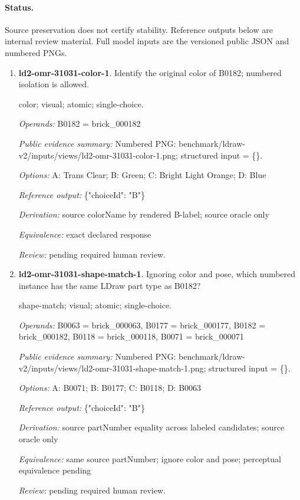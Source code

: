 \paragraph{Status.}Source preservation does not certify stability. Reference outputs below are internal review material. Full model inputs are the versioned public JSON and numbered PNGs.
\begin{enumerate}
\item \textbf{ld2-omr-31031-color-1}. Identify the original color of B0182; numbered isolation is allowed.
\par{\small color; visual; atomic; single-choice.\par\textit{Operands:} B0182 = brick\_000182\par\textit{Public evidence summary:} Numbered PNG: benchmark/ldraw-v2/inputs/views/ld2-omr-31031-color-1.png; structured input = \{\}.\par\textit{Options:} A: Trans Clear; B: Green; C: Bright Light Orange; D: Blue\par\textit{Reference output:} \{"choiceId": "B"\}\par\textit{Derivation:} source colorName by rendered B-label; source oracle only\par\textit{Equivalence:} exact declared response\par\textit{Review:} pending required human review.}
\item \textbf{ld2-omr-31031-shape-match-1}. Ignoring color and pose, which numbered instance has the same LDraw part type as B0182?
\par{\small shape-match; visual; atomic; single-choice.\par\textit{Operands:} B0063 = brick\_000063, B0177 = brick\_000177, B0182 = brick\_000182, B0118 = brick\_000118, B0071 = brick\_000071\par\textit{Public evidence summary:} Numbered PNG: benchmark/ldraw-v2/inputs/views/ld2-omr-31031-shape-match-1.png; structured input = \{\}.\par\textit{Options:} A: B0071; B: B0177; C: B0118; D: B0063\par\textit{Reference output:} \{"choiceId": "B"\}\par\textit{Derivation:} source partNumber equality across labeled candidates; source oracle only\par\textit{Equivalence:} same source partNumber; ignore color and pose; perceptual equivalence pending\par\textit{Review:} pending required human review.}

\end{enumerate}
